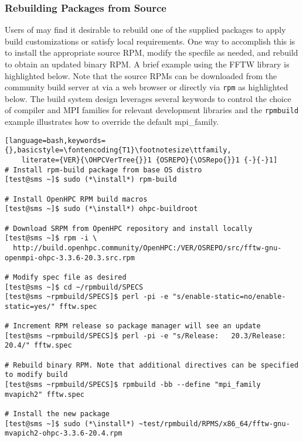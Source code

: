 \clearpage
\subsubsection{Rebuilding Packages from Source}  \label{appendix:rpmbuild}

Users of \OHPC{} may find it desirable to rebuild one of the supplied packages
to apply build customizations or satisfy local requirements. One way to
accomplish this is to install the appropriate source RPM, modify the specfile
as needed, and rebuild to obtain an updated binary RPM. A brief example using
the FFTW library is highlighted below.  Note that the source RPMs can be downloaded from the
community build server at \href{https://build.openhpc.community}
{\color{blue}{https://build.openhpc.community}} via a web browser or directly
via \texttt{rpm} as highlighted below. The \OHPC{} build system design
leverages several keywords to control the choice of compiler and MPI families
for relevant development libraries and the \texttt{rpmbuild} example
illustrates how to override the default mpi\_family.

\begin{lstlisting}[language=bash,keywords={},basicstyle=\fontencoding{T1}\footnotesize\ttfamily,
    literate={VER}{\OHPCVerTree{}}1 {OSREPO}{\OSRepo{}}1 {-}{-}1]
# Install rpm-build package from base OS distro
[test@sms ~]$ sudo (*\install*) rpm-build

# Install OpenHPC RPM build macros
[test@sms ~]$ sudo (*\install*) ohpc-buildroot

# Download SRPM from OpenHPC repository and install locally
[test@sms ~]$ rpm -i \
  http://build.openhpc.community/OpenHPC:/VER/OSREPO/src/fftw-gnu-openmpi-ohpc-3.3.6-20.3.src.rpm

# Modify spec file as desired
[test@sms ~]$ cd ~/rpmbuild/SPECS
[test@sms ~rpmbuild/SPECS]$ perl -pi -e "s/enable-static=no/enable-static=yes/" fftw.spec

# Increment RPM release so package manager will see an update
[test@sms ~rpmbuild/SPECS]$ perl -pi -e "s/Release:   20.3/Release:   20.4/" fftw.spec

# Rebuild binary RPM. Note that additional directives can be specified to modify build
[test@sms ~rpmbuild/SPECS]$ rpmbuild -bb --define "mpi_family mvapich2" fftw.spec

# Install the new package
[test@sms ~]$ sudo (*\install*) ~test/rpmbuild/RPMS/x86_64/fftw-gnu-mvapich2-ohpc-3.3.6-20.4.rpm
\end{lstlisting}
